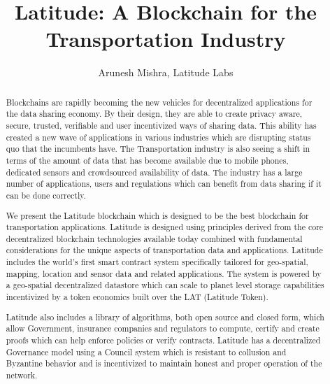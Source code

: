 \documentclass[preprint,10pt]{elsarticle}
\theoremstyle{definition}
\begin{document}
\begin{frontmatter}


    \title{\textsf{Latitude: A Blockchain for the Transportation Industry}}

\author{Arunesh Mishra, Latitude Labs}
\address{Silicon Valley, California}

\begin{abstract}

Blockchains are rapidly becoming the new vehicles for decentralized applications for the data sharing economy. By their
    design, they are able to create privacy aware, secure, trusted, verifiable and user incentivized ways of sharing
    data. This ability has created a new wave of applications in various industries which are disrupting status quo that
    the incumbents have. The Transportation industry is also seeing a shift in terms of the amount of data that has
    become available due to mobile phones, dedicated sensors and crowdsourced availability of data. The industry has a
    large number of applications, users and regulations which can benefit from data sharing if it can be done correctly.

 We present the Latitude blockchain which is designed to be the best blockchain for transportation applications.
    Latitude is designed using principles derived from the core decentralized blockchain technologies available today
    combined with fundamental considerations for the unique aspects of transportation data and applications. Latitude
    includes the world's first smart contract system specifically tailored for geo-spatial, mapping, location and sensor
    data and related applications. The system is powered by a geo-spatial decentralized datastore which can scale to
    planet level storage capabilities incentivized by a token economics built over the LAT (Latitude Token).

    Latitude also includes a library of algorithms, both open source and closed form, which allow Government, insurance
    companies and regulators to compute, certify and create proofs which can help enforce policies or verify contracts.
    Latitude has a decentralized Governance model using a Council system which is resistant to collusion and Byzantine
    behavior and is incentivized to maintain honest and proper operation of the network.
 

\end{abstract}
\end{frontmatter}
\end{document}
